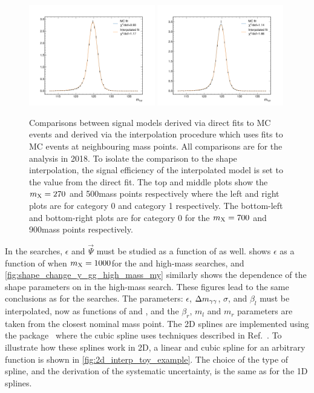 \begin{figure}
  \includegraphics[width=0.49\textwidth]{Figures/Dihiggs/signal/interpolation_check/graviton/interpolation_check_700_125_2018_0.pdf}
  \includegraphics[width=0.49\textwidth]{Figures/Dihiggs/signal/interpolation_check/graviton/interpolation_check_900_125_2018_0.pdf} \\
  \caption[Validation of Shape Parameter Interpolation]{Comparisons between signal models derived via direct fits to MC events and derived via the interpolation procedure which uses fits to MC events at neighbouring mass points. All comparisons are for the \XTwoHH analysis in 2018. To isolate the comparison to the shape interpolation, the signal efficiency of the interpolated model is set to the value from the direct fit. The top and middle plots show the $m_{\mathrm{X}}=270$ and 500\GeV mass points respectively where the left and right plots are for category 0 and category 1 respectively. The bottom-left and bottom-right plots are for category 0 for the $m_{\mathrm{X}}=700$ and 900\GeV mass points respectively.}\label{fig:shape_interpolation_check}
\end{figure}

In the \XYH searches, $\epsilon$ and $\vec{\Psi}$ must be studied as a function of \mY as well.  shows $\epsilon$ as a function of \mY when $m_{\mathrm{X}}=1000$\GeV for the \XYttHgg and high-mass \XYggHtt searches, and \cref{fig:shape_change_y_gg_high_mass_my} similarly shows the dependence of the shape parameters on \mY in the high-mass \XYggHtt search. These figures lead to the same conclusions as for the \XHH searches. The parameters: $\epsilon$, $\Delta m_{\gamma\gamma}$, $\sigma$, and $\beta_l$ must be interpolated, now as functions of \mX and \mY, and the $\beta_r$, $m_l$ and $m_r$ parameters are taken from the closest nominal mass point. The 2D splines are implemented using the \SCIPY package~\cite{2020SciPy-NMeth} where the cubic spline uses techniques described in Ref.~\cite{ALFELD1984169}. To illustrate how these splines work in 2D, a linear and cubic spline for an arbitrary function is shown in \cref{fig:2d_interp_toy_example}. The choice of the type of spline, and the derivation of the systematic uncertainty, is the same as for the 1D splines. 

